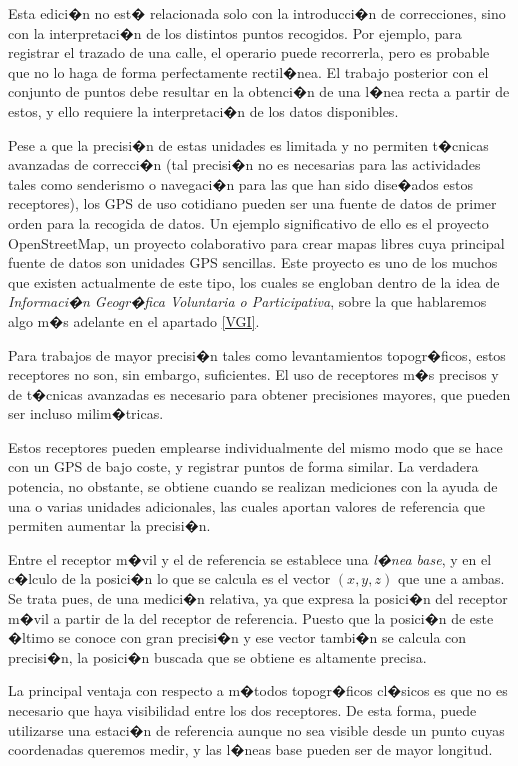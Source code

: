Esta edici�n no est� relacionada solo con la introducci�n de correcciones, sino con la interpretaci�n de los distintos puntos recogidos. Por ejemplo, para registrar el trazado de una calle, el operario puede recorrerla, pero es probable que no lo haga de forma perfectamente rectil�nea. El trabajo posterior con el conjunto de puntos debe resultar en la obtenci�n de una l�nea recta a partir de estos, y ello requiere la interpretaci�n de los datos disponibles.

Pese a que la precisi�n de estas unidades es limitada y no permiten t�cnicas avanzadas de correcci�n (tal precisi�n no es necesarias para las actividades tales como senderismo o navegaci�n para las que han sido dise�ados estos receptores), los GPS de uso cotidiano pueden ser una fuente de datos de primer orden para la recogida de datos. Un ejemplo significativo de ello es el proyecto OpenStreetMap\cite{webOSM}, un proyecto colaborativo para crear mapas libres  cuya principal fuente de datos son unidades GPS sencillas. Este proyecto es uno de los muchos que existen actualmente de este tipo, los cuales se engloban dentro de la idea de \emph{Informaci�n Geogr�fica Voluntaria o Participativa}, sobre la que hablaremos algo m�s adelante en el apartado \ref{VGI}.

Para trabajos de mayor precisi�n tales como levantamientos topogr�ficos, estos receptores no son, sin embargo, suficientes. El uso de receptores m�s precisos y de t�cnicas avanzadas es necesario para obtener precisiones mayores, que pueden ser incluso milim�tricas. 

Estos receptores pueden emplearse individualmente del mismo modo que se hace con un GPS de bajo coste, y registrar puntos de forma similar. La verdadera potencia, no obstante, se obtiene cuando se realizan mediciones con la ayuda de una o varias unidades adicionales, las cuales aportan valores de referencia que permiten aumentar la precisi�n. 

Entre el receptor m�vil y el de referencia se establece una \emph{l�nea base}, y en el c�lculo de la posici�n lo que se calcula es el vector $(x, y, z)$ que une a ambas. Se trata pues, de una medici�n relativa, ya que expresa la posici�n del receptor m�vil a partir de la del receptor de referencia. Puesto que la posici�n de este �ltimo se conoce con gran precisi�n y ese vector tambi�n se calcula con precisi�n, la posici�n buscada que se obtiene es altamente precisa.

La principal ventaja con respecto a m�todos topogr�ficos cl�sicos es que no es necesario que haya visibilidad entre los dos receptores. De esta forma, puede utilizarse una estaci�n de referencia aunque no sea visible desde un punto cuyas coordenadas queremos medir, y las l�neas base pueden ser de mayor longitud.

